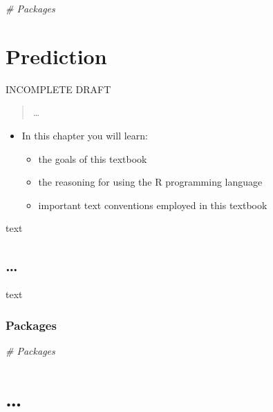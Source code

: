 \documentclass[
]{article}
\newenvironment{Shaded}{\begin{snugshade}}{\end{snugshade}}
\newcommand{\CommentTok}[1]{\textcolor[rgb]{0.56,0.35,0.01}{\textit{#1}}}
\providecommand{\tightlist}{%
  \setlength{\itemsep}{0pt}\setlength{\parskip}{0pt}}
\newenvironment{rmdblock}[1]
  {\begin{shaded*}
  \begin{itemize}
  \renewcommand{\labelitemi}{
    \raisebox{-.5\height}[0pt][0pt]{
      {\setkeys{Gin}{width=2em,keepaspectratio}\texttt{[image: assets/images/\#1]}}
    }
  }
  \item
  }
  {
  \end{itemize}
  \end{shaded*}
  }
\newenvironment{rmdkey}
  {\begin{rmdblock}{key}}
  {\end{rmdblock}}
\begin{document}
\begin{Shaded}
\begin{Highlighting}[]
\CommentTok{\# Packages}
\end{Highlighting}
\end{Shaded}

\hypertarget{prediction}{%
\section{Prediction}\label{prediction}}

INCOMPLETE DRAFT

\begin{quote}
\ldots{}
\end{quote}

\begin{rmdkey}
In this chapter you will learn:

\begin{itemize}
\tightlist
\item
  the goals of this textbook
\item
  the reasoning for using the R programming language
\item
  important text conventions employed in this textbook
\end{itemize}
\end{rmdkey}

text

\hypertarget{section-5}{%
\subsection{\ldots{}}\label{section-5}}

text

\hypertarget{prediction-packages}{%
\subsubsection{Packages}\label{prediction-packages}}

\begin{Shaded}
\begin{Highlighting}[]
\CommentTok{\# Packages}
\end{Highlighting}
\end{Shaded}

\hypertarget{appendix-appendix}{%
\appendix}


\hypertarget{section-6}{%
\section{\ldots{}}\label{section-6}}

  
\end{document}
